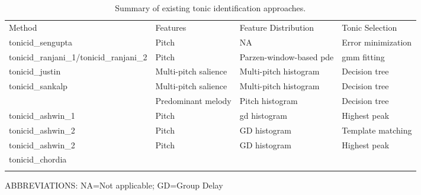 \begin{table}
	\begin{threeparttable} 
		\small
		\begin{centering}
			\begin{tabular}{l L{4.5cm} L{4.5cm} L{3.5cm} }
				\tabletop			
				Method 	&	Features	&	Feature Distribution	&	Tonic Selection \\
				\tablemid			
				\acrshort{tonicid_sengupta} \citep{Sengupta2005b}	&	Pitch \citep{AKDatta_1996} & NA & Error minimization\\
				
				\acrshort{tonicid_ranjani_1}/\acrshort{tonicid_ranjani_2} \citep{ranjani2011carnatic}	&	Pitch \citep{BoersmaPaul2001} & Parzen-window-based \acrshort{pde}  & \acrshort{gmm} fitting\\
				
				\acrshort{tonicid_justin} \citep{salamon2012multipitch} & Multi-pitch salience \citep{Salamon2011} & Multi-pitch histogram & Decision tree\\
				
				\acrshort{tonicid_sankalp} \citep{gulati2012two}	& Multi-pitch salience  \citep{Salamon2011} & Multi-pitch histogram & Decision tree\\
				
				&	Predominant melody \citep{Salamon2012} & Pitch histogram & Decision tree\\
				
				\acrshort{tonicid_ashwin_1} \citep{bellur2012knowledge}	&	Pitch \citep{DeCheveigne2002}	&  \acrshort{gd} histogram & Highest peak\\
				
				\acrshort{tonicid_ashwin_2} \citep{bellur2012knowledge}	&	Pitch \citep{DeCheveigne2002}	& 	GD histogram	&
				Template matching\\
				
				\acrshort{tonicid_ashwin_2} \citep{bellur2012knowledge}	&	Pitch \citep{DeCheveigne2002}	& 	GD histogram
				& Highest peak\\
				
				\acrshort{tonicid_chordia} \citep{chordia2013joint}	& 	& 	& \\			
				
				\tablebot		
			\end{tabular}
			\par \end{centering}		
		\begin{tablenotes}
			\item[] ABBREVIATIONS: NA=Not applicable; GD=Group Delay 
		\end{tablenotes}
			\caption[Summary of existing tonic identification approaches.]{Summary of existing tonic identification approaches.}
			\label{tab:pre_processing_tonic_identification_summary_methods}
	\end{threeparttable}
\end{table}

